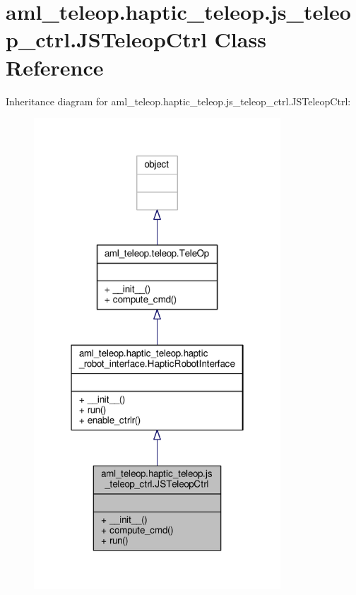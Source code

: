 \hypertarget{classaml__teleop_1_1haptic__teleop_1_1js__teleop__ctrl_1_1_j_s_teleop_ctrl}{\section{aml\-\_\-teleop.\-haptic\-\_\-teleop.\-js\-\_\-teleop\-\_\-ctrl.\-J\-S\-Teleop\-Ctrl Class Reference}
\label{classaml__teleop_1_1haptic__teleop_1_1js__teleop__ctrl_1_1_j_s_teleop_ctrl}
}


Inheritance diagram for aml\-\_\-teleop.\-haptic\-\_\-teleop.\-js\-\_\-teleop\-\_\-ctrl.\-J\-S\-Teleop\-Ctrl\-:
\nopagebreak
\begin{figure}[H]
\begin{center}
\leavevmode
\includegraphics[width=262pt]{classaml__teleop_1_1haptic__teleop_1_1js__teleop__ctrl_1_1_j_s_teleop_ctrl__inherit__graph}
\end{center}
\end{figure}


